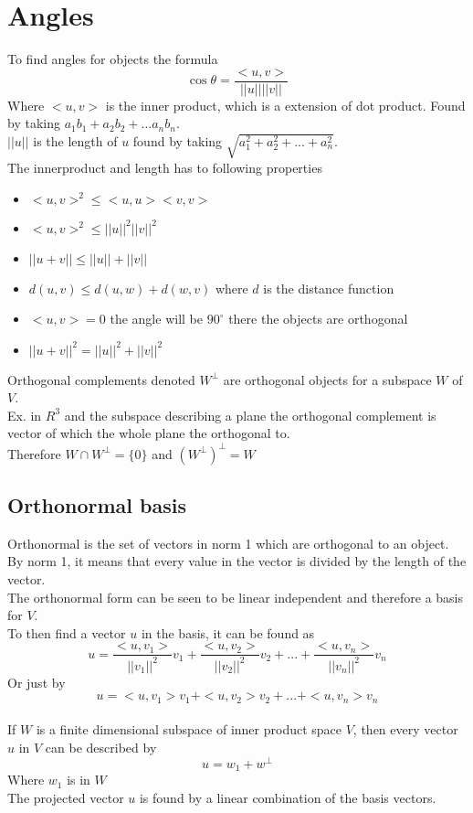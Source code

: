 \documentclass[12pt, a4paper]{article}
\begin{document}
	\section{Angles}
		To find angles for objects the formula
		$$\cos\theta = \frac{<u,v>}{||u||||v||}$$
		Where $<u,v>$ is the inner product, which is a extension of dot product. Found by taking $a_1b_1+a_2b_2+...a_nb_n$.\\
		$||u||$ is the length of $u$ found by taking $\sqrt{a_1^2+a_2^2+...+a_n^2}$.\\
		The innerproduct and length has to following properties
		\begin{itemize}
			\item $<u,v>^2\leq <u,u><v,v>$
			\item $<u,v>^2\leq ||u||^2||v||^2$
			\item $||u+v||\leq ||u||+||v||$
			\item $d(u,v)\leq d(u,w)+d(w,v)$ where $d$ is the distance function
			\item $<u,v>=0$ the angle will be $90^\circ$ there the objects are orthogonal
			\item $||u+v||^2=||u||^2+||v||^2$
		\end{itemize}
		Orthogonal complements denoted $W^\perp$ are orthogonal objects for a subspace $W$ of $V$.\\
		Ex. in $R^3$ and the subspace describing a plane the orthogonal complement is vector of which the whole plane the orthogonal to.\\
		Therefore $W\cap W^\perp=\{0\}$ and $(W^\perp)^\perp=W$\\
		\subsection{Orthonormal basis}
			Orthonormal is the set of vectors in norm 1 which are orthogonal to an object.\\
			By norm 1, it means that every value in the vector is divided by the length of the vector.\\
			The orthonormal form can be seen to be linear independent and therefore a basis for $V$.\\
			To then find a vector $u$ in the basis, it can be found as
			$$u=\frac{<u,v_1>}{||v_1||^2}v_1+\frac{<u,v_2>}{||v_2||^2}v_2+...+\frac{<u,v_n>}{||v_n||^2}v_n$$
			Or just by 
			$$u=<u,v_1>v_1+<u,v_2>v_2+...+<u,v_n>v_n$$\\[4mm]
			If $W$ is a finite dimensional subspace of inner product space $V$, then every vector $u$ in $V$ can be described by\\
			$$u=w_1+w^\perp$$
			Where $w_1$ is in $W$\\
			The projected vector $u$ is found by a linear combination of the basis vectors.
\end{document}
